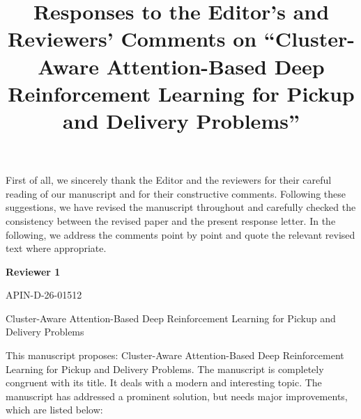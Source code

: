 \documentclass{article}
\title{Responses to the Editor's and Reviewers' Comments on ``Cluster-Aware Attention-Based Deep Reinforcement Learning for Pickup and Delivery Problems''}
\author{}
\date{}
\begin{document}
\maketitle

First of all, we sincerely thank the Editor and the reviewers for their careful reading of our manuscript and for their constructive comments. Following these suggestions, we have revised the manuscript throughout and carefully checked the consistency between the revised paper and the present response letter. In the following, we address the comments point by point and quote the relevant revised text where appropriate.
\

\begin{center}
\Large \textbf{Reviewer 1}
\end{center}

\noindent APIN-D-26-01512

\noindent Cluster-Aware Attention-Based Deep Reinforcement Learning for Pickup and Delivery Problems

\noindent This manuscript proposes: Cluster-Aware Attention-Based Deep Reinforcement Learning for Pickup and Delivery Problems. The manuscript is completely congruent with its title. It deals with a modern and interesting topic. The manuscript has addressed a prominent solution, but needs major improvements, which are listed below:
\end{document}
